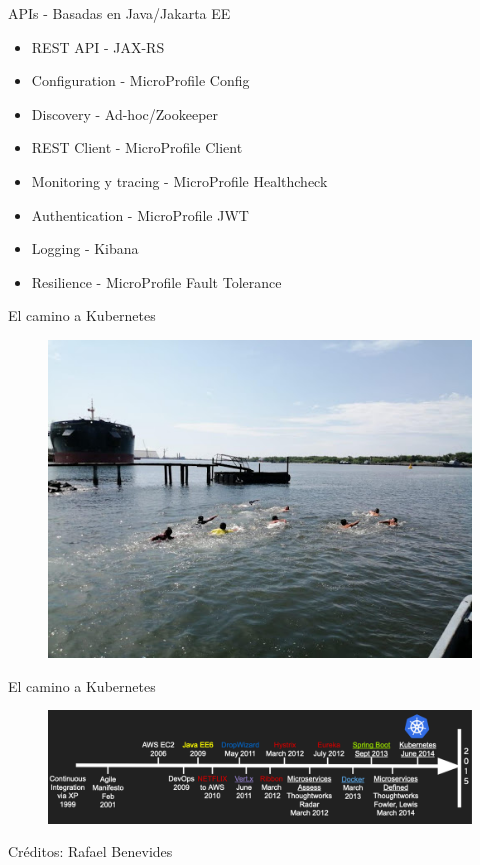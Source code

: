 \documentclass[aspectratio=169]{beamer}
\begin{document}
\begin{frame}{APIs - Basadas en Java/Jakarta EE}
    \begin{itemize}
        \item REST API - JAX-RS
        \item Configuration - MicroProfile Config
        \item Discovery - Ad-hoc/Zookeeper
        \item REST Client - MicroProfile Client
        \item Monitoring y tracing - MicroProfile Healthcheck
        \item Authentication - MicroProfile JWT
        \item Logging - Kibana 
        \item Resilience - MicroProfile Fault Tolerance
    \end{itemize}
\end{frame}

\begin{frame}{El camino a Kubernetes}
    \begin{figure}
        \centering
        \includegraphics[width=0.5\linewidth]{Images/run}
    \end{figure}
\end{frame}


\begin{frame}{El camino a Kubernetes}
    \begin{figure}
        \centering
        \includegraphics[width=\linewidth]{Images/timeline.png}
        \label{fig:container}
    \end{figure}

    Créditos: Rafael Benevides
\end{frame}
\end{document}

